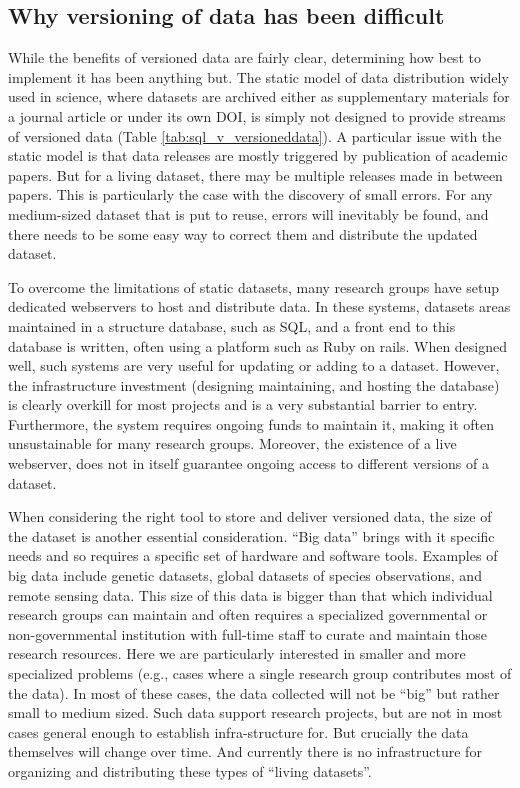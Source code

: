 \documentclass[a4paper,11pt]{article}
\begin{document}
\subsection{Why versioning of data has been difficult}

While the benefits of versioned data are fairly clear, determining how best to implement it has been anything but. The static model of data distribution widely used in science, where datasets are archived either as supplementary materials for a journal article
or under its own DOI, is simply not designed to provide streams of versioned
data (Table \ref{tab:sql_v_versioneddata}). A particular issue with the static
model is that data releases are mostly triggered by publication of academic
papers. But for a living dataset, there may be multiple releases made in
between papers. This is particularly the case with the discovery of small
errors. For any medium-sized dataset that is put to reuse, errors will
inevitably be found, and there needs to be some easy  way to correct them and
distribute the updated dataset.

To overcome the limitations of static datasets, many research groups have
setup dedicated webservers to host and distribute data. In these systems,
datasets areas maintained in a structure database, such as SQL, and a front
end to this database is written, often using a platform such as Ruby on rails.
When designed well, such systems are very useful for updating or adding to a
dataset. However, the infrastructure investment (designing maintaining, and
hosting the database) is clearly overkill for most projects and is a very
substantial barrier to entry. Furthermore, the system requires ongoing funds to maintain it, making it often unsustainable for many research groups. Moreover, the existence of a live webserver,
does not in itself guarantee ongoing access to different versions of a
dataset.

When considering the right tool to store and deliver versioned data, the size
of the dataset is another essential consideration. ``Big data'' brings with it
specific needs and so requires a specific set of hardware and software tools.
Examples of big data include genetic datasets, global datasets of species
observations, and remote sensing data. This size of this data is bigger than
that which individual research groups can maintain and often requires a
specialized governmental or non-governmental institution with full-time staff
to curate and maintain those research resources. Here we are particularly
interested in smaller and more specialized problems (e.g., cases where a single 
research group contributes most of the data). In most of these cases, the data
collected will not be ``big'' but rather small to medium sized. Such data
support research projects, but are not in most cases general enough to
establish infra-structure for. But crucially the data themselves will change
over time. And currently there is no infrastructure for organizing and
distributing these types of ``living datasets''.
\end{document}
